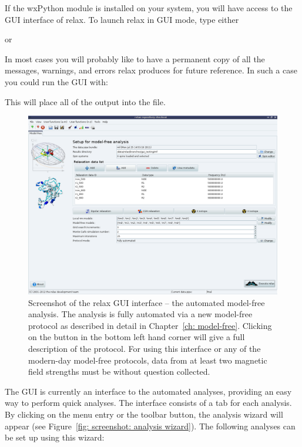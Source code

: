 If the wxPython module is installed on your system, you will have access to the GUI interface of relax.  To launch relax in GUI mode, type either


or


In most cases you will probably like to have a permanent copy of all the messages, warnings, and errors relax produces for future reference.  In such a case you could run the GUI with:


This will place all of the output into the  file.

\begin{figure}
\centerline{\includegraphics[width=\textwidth, bb=14 14 1065 768]{graphics/screenshots/analysis_mf}}
\caption[GUI screenshot -- Model-free analysis]{Screenshot of the relax GUI interface -- the automated model-free analysis.  The analysis is fully automated via a new model-free protocol as described in detail in Chapter~\ref{ch: model-free}.  Clicking on the  button in the bottom left hand corner will give a full description of the protocol.  For using this interface or any of the modern-day model-free protocols, data from at least two magnetic field strengths must be without question collected.}\label{fig: screenshot: model-free analysis}
\end{figure}

The GUI is currently an interface to the automated analyses, providing an easy way to perform quick analyses.  The interface consists of a tab for each analysis.  By clicking on the  menu entry or the  toolbar button, the analysis wizard will appear (see Figure~\ref{fig: screenshot: analysis wizard}).  The following analyses can be set up using this wizard:

